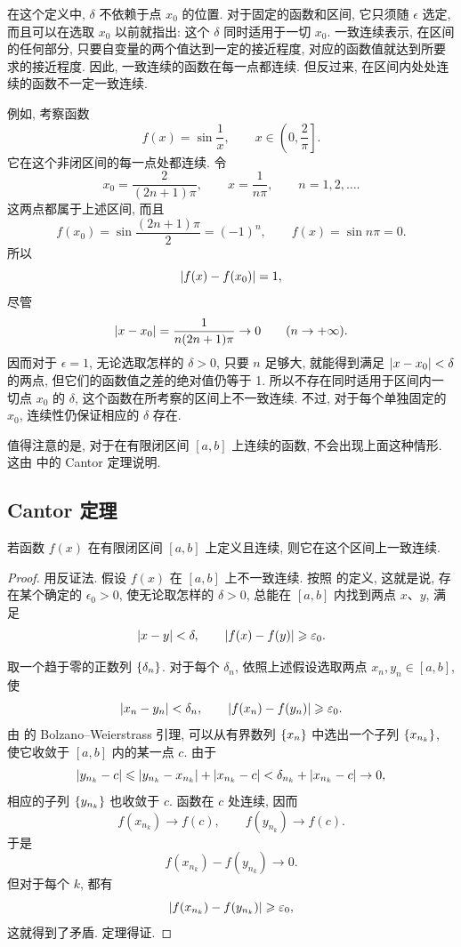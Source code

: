 在这个定义中, $\delta$ 不依赖于点 $x_0$ 的位置.
对于固定的函数和区间, 它只须随 $\epsilon$ 选定,
而且可以在选取 $x_0$ 以前就指出: 这个 $\delta$ 同时适用于一切 $x_0$.
一致连续表示, 在区间的任何部分,
只要自变量的两个值达到一定的接近程度,
对应的函数值就达到所要求的接近程度.
因此, 一致连续的函数在每一点都连续.
但反过来, 在区间内处处连续的函数不一定一致连续.

例如, 考察函数
$$
f(x)=\sin\frac1x,\qquad x\in\left(0,\frac2\pi\right].
$$
它在这个非闭区间的每一点处都连续.
令
$$
x_0=\frac2{(2n+1)\pi},\qquad x=\frac1{n\pi},
\qquad n=1,2,\ldots.
$$
这两点都属于上述区间, 而且
$$
f(x_0)=\sin\frac{(2n+1)\pi}{2}=(-1)^n,\qquad
f(x)=\sin n\pi=0.
$$
所以
$$
\left| f(x)-f(x_0) \right|=1,
$$
尽管
$$
\left| x-x_0 \right|=\frac1{n(2n+1)\pi}\to0\qquad(n\to+\infty).
$$
因而对于 $\epsilon=1$, 无论选取怎样的 $\delta>0$,
只要 $n$ 足够大, 就能得到满足 $\left| x-x_0 \right|<\delta$ 的两点,
但它们的函数值之差的绝对值仍等于 1.
所以不存在同时适用于区间内一切点 $x_0$ 的 $\delta$,
这个函数在所考察的区间上不一致连续.
不过, 对于每个单独固定的 $x_0$, 连续性仍保证相应的 $\delta$ 存在.

值得注意的是, 对于在有限闭区间 $[a,b]$ 上连续的函数,
不会出现上面这种情形. 这由  中的 Cantor 定理说明.

\subsection{Cantor 定理}\label{subsec:87}
{\kaishu 若函数 $f(x)$ 在有限闭区间 $[a,b]$ 上定义且连续,
则它在这个区间上一致连续.}

\begin{proof}
用反证法. 假设 $f(x)$ 在 $[a,b]$ 上不一致连续.
按照  的定义, 这就是说, 存在某个确定的 $\epsilon_0>0$,
使无论取怎样的 $\delta>0$, 总能在 $[a,b]$ 内找到两点 $x$、$y$, 满足
$$
\left| x-y \right|<\delta,\qquad
\left| f(x)-f(y) \right|\geqslant\varepsilon_0.
$$

取一个趋于零的正数列 $\{\delta_{n}\}$.
对于每个 $\delta_n$, 依照上述假设选取两点 $x_n,y_n\in[a,b]$, 使
$$
\left| x_n-y_n \right|<\delta_n,\qquad
\left| f(x_n)-f(y_n) \right|\geqslant\varepsilon_0.
$$
由  的 Bolzano--Weierstrass 引理,
可以从有界数列 $\{x_{n}\}$ 中选出一个子列 $\left\{ x_{n_k} \right\}$,
使它收敛于 $[a,b]$ 内的某一点 $c$.
由于
$$
\left| y_{n_k}-c \right|
\leqslant\left| y_{n_k}-x_{n_k} \right|+\left| x_{n_k}-c \right|
<\delta_{n_k}+\left| x_{n_k}-c \right|\to0,
$$
相应的子列 $\left\{ y_{n_k} \right\}$ 也收敛于 $c$.
函数在 $c$ 处连续, 因而
$$
f(x_{n_k})\to f(c),\qquad f(y_{n_k})\to f(c).
$$
于是
$$
f(x_{n_k})-f(y_{n_k})\to0.
$$
但对于每个 $k$, 都有
$$
\left| f(x_{n_k})-f(y_{n_k}) \right|\geqslant\varepsilon_0,
$$
这就得到了矛盾. 定理得证.
\end{proof}

